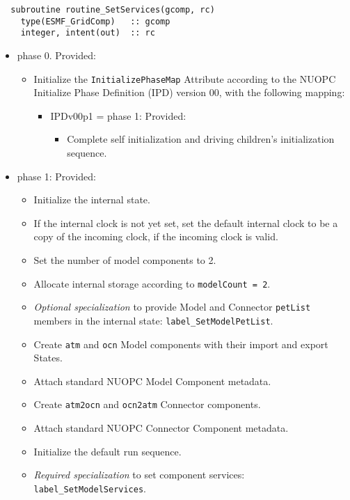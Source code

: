 \begin{verbatim}  subroutine routine_SetServices(gcomp, rc)
    type(ESMF_GridComp)   :: gcomp
    integer, intent(out)  :: rc
\end{verbatim}

\begin{itemize}
\item phase 0. {\sc Provided:}
  \begin{itemize}
  \item Initialize the {\tt InitializePhaseMap} Attribute according to the NUOPC Initialize Phase Definition (IPD) version 00, with the following mapping:
    \begin{itemize}
    \item IPDv00p1 = phase 1: {\sc Provided:} 
      \begin{itemize}
      \item Complete self initialization and driving children's initialization sequence.
      \end{itemize}
    \end{itemize}  
  \end{itemize}  
\item phase 1: {\sc Provided:}
  \begin{itemize}
  \item Initialize the internal state.
  \item If the internal clock is not yet set, set the default internal clock to be a copy of the incoming clock, if the incoming clock is valid.
  \item Set the number of model components to 2.
  \item Allocate internal storage according to {\tt modelCount = 2}.
  \item {\it Optional specialization} to provide Model and Connector {\tt petList} members in the internal state: {\tt label\_SetModelPetList}.
  \item Create {\tt atm} and {\tt ocn} Model components with their import and export States.
  \item Attach standard NUOPC Model Component metadata.
  \item Create {\tt atm2ocn} and {\tt ocn2atm} Connector components.
  \item Attach standard NUOPC Connector Component metadata.
  \item Initialize the default run sequence.
  \item {\it Required specialization} to set component services: {\tt label\_SetModelServices}. 

\end{itemize}
\end{itemize}
